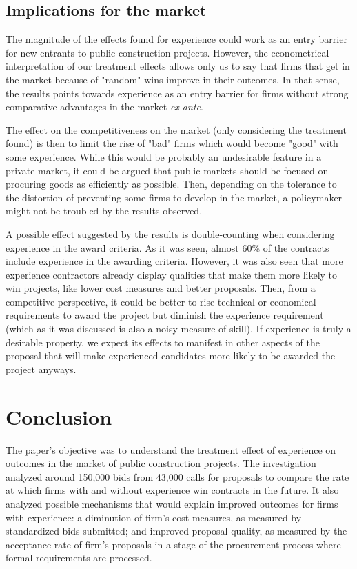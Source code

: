 \section{Implications for the market}
The magnitude of the effects found for experience could work as an entry barrier for new entrants to public construction projects. However, the econometrical interpretation of our treatment effects allows only us to say that firms that get in the market because of "random" wins improve in their outcomes. In that sense, the results points towards experience as an entry barrier for firms without strong comparative advantages in the market \textit{ex ante}.

The effect on the competitiveness on the market (only considering the treatment found) is then to limit the rise of "bad" firms which would become "good" with some experience. While this would be probably an undesirable feature in a private market, it could be argued that public markets should be focused on procuring goods as efficiently as possible. Then, depending on the tolerance to the distortion of preventing some firms to develop in the market, a policymaker might not be troubled by the results observed.

A possible effect suggested by the results is double-counting when considering experience in the award criteria. As it was seen, almost 60\% of the contracts include experience in the awarding criteria. However, it was also seen that more experience contractors already display qualities that make them more likely to win projects, like lower cost measures and better proposals. Then, from a competitive perspective, it could be better to rise technical or economical requirements to award the project but diminish the experience requirement (which as it was discussed is also a noisy measure of skill). If experience is truly a desirable property, we expect its effects to manifest in other aspects of the proposal that will make experienced candidates more likely to be awarded the project anyways.


\chapter{Conclusion}
The paper's objective was to understand the treatment effect of experience on outcomes in the market of public construction projects. The investigation analyzed around 150,000 bids from 43,000 calls for proposals to compare the rate at which firms with and without experience win contracts in the future. It also analyzed possible mechanisms that would explain improved outcomes for firms with experience: a diminution of firm's cost measures, as measured by standardized bids submitted; and improved proposal quality, as measured by the acceptance rate of firm's proposals in a stage of the procurement process where formal requirements are processed.

